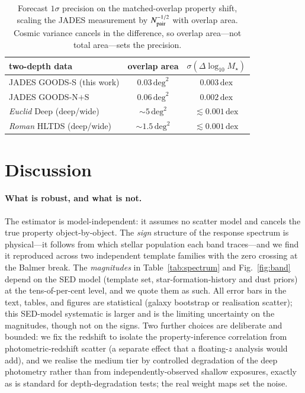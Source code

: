 \documentclass{aa}
\newcommand{\Mst}{M_\star}
\newcommand{\dex}{\,\mathrm{dex}}
\begin{document}
\begin{table}
\centering
\caption{Forecast $1\sigma$ precision on the matched-overlap property shift, scaling the JADES
measurement by $N_{\rm pair}^{-1/2}$ with overlap area. Cosmic variance cancels in the
difference, so overlap area---not total area---sets the precision.}
\label{tab:fore}
\begin{tabular}{lcc}
\toprule
two-depth data & overlap area & $\sigma(\Delta\log_{10}\Mst)$ \\
\midrule
JADES GOODS-S (this work)          & $0.03\,\mathrm{deg}^2$ & $0.003\dex$ \\
JADES GOODS-N$+$S                   & $0.06\,\mathrm{deg}^2$ & $0.002\dex$ \\
\emph{Euclid} Deep (deep/wide)     & $\sim\!5\,\mathrm{deg}^2$ & $\lesssim0.001\dex$ \\
\emph{Roman} HLTDS (deep/wide)     & $\sim\!1.5\,\mathrm{deg}^2$ & $\lesssim0.001\dex$ \\
\bottomrule
\end{tabular}
\end{table}

\section{Discussion}
\label{sec:discussion}

\paragraph{What is robust, and what is not.} The estimator is model-independent: it assumes no
scatter model and cancels the true property object-by-object. The \emph{sign} structure of the
response spectrum is physical---it follows from which stellar population each band traces---and we
find it reproduced across two independent template families with the zero crossing at the Balmer
break. The \emph{magnitudes} in Table~\ref{tab:spectrum} and Fig.~\ref{fig:band} depend on the SED
model (template set, star-formation-history and dust priors) at the tens-of-per-cent level, and we
quote them as such. All error bars in the text, tables, and figures are statistical (galaxy
bootstrap or realisation scatter); this SED-model systematic is larger and is the limiting
uncertainty on the magnitudes, though not on the signs. Two further choices are deliberate and bounded: we fix the redshift to isolate
the property-inference correlation from photometric-redshift scatter (a separate effect that a
floating-$z$ analysis would add), and we realise the medium tier by controlled degradation of the
deep photometry rather than from independently-observed shallow exposures, exactly as is standard
for depth-degradation tests; the real weight maps set the noise.
\end{document}
